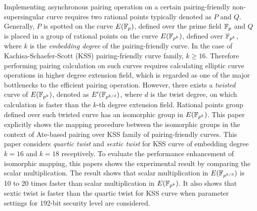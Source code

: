 Implementing asynchronous pairing operation on  a certain pairing-friendly non-supersingular curve requires two rational points typically denoted as $P$ and $Q$. Generally, $P$ is spotted on the curve  $E(\mathbb{F}_p)$, defined over the prime field $\mathbb{F}_p$ and $Q$ is placed in a group of rational points on the curve $E(\mathbb{F}_{p^k})$, defined over $\mathbb{F}_{p^k}$, where $k$ is the \textit{embedding degree} of the pairing-friendly curve. In the case of  Kachisa-Schaefer-Scott (KSS) pairing-friendly curve family, $k \geq 16$. Therefore performing pairing calculation on such curves requires calculating elliptic curve operations in higher degree extension field, which is regarded as one of the major bottlenecks to the efficient pairing operation. However, there exists a \textit{twisted} curve of $E(\mathbb{F}_{p^k})$, denoted as  $E'(\mathbb{F}_{p^{k/d}})$, where $d$ is the twist degree, on which calculation is faster than the $k$-th degree extension field. Rational points group defined over such twisted curve has an isomorphic group in $E(\mathbb{F}_{p^k})$. This paper explicitly shows the mapping  procedure between the isomorphic groups in the context of Ate-based pairing over KSS family of pairing-friendly curves. This paper considers \textit{quartic twist} and \textit{sextic twist} for KSS curve of embedding degree $k =16$ and $k=18$ receptively.  To evaluate the performance enhancement of isomorphic mapping, this papers shows the experimental result by comparing the scalar multiplication. The result shows that scalar multiplication in $E(\mathbb{F}_{p^{k/d}})$ is 10 to 20  times faster than scalar multiplication in $E(\mathbb{F}_{p^k})$. It also shows that sextic twist is faster than the quartic twist for KSS curve when parameter settings for 192-bit security level are considered. 


